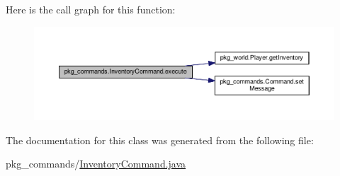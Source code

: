 Here is the call graph for this function\-:
\nopagebreak
\begin{figure}[H]
\begin{center}
\leavevmode
\includegraphics[width=350pt]{classpkg__commands_1_1InventoryCommand_a16ce9e3db461ecb7c4a50d2bdef65022_cgraph}
\end{center}
\end{figure}




The documentation for this class was generated from the following file\-:\begin{DoxyCompactItemize}
\item 
pkg\-\_\-commands/\hyperlink{InventoryCommand_8java}{Inventory\-Command.\-java}\end{DoxyCompactItemize}
